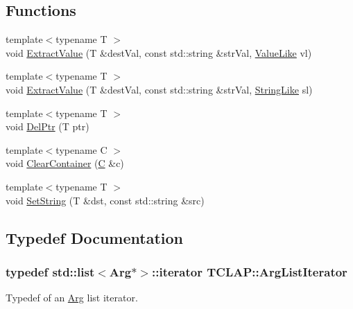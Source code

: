 \subsection*{Functions}
\begin{DoxyCompactItemize}
\item 
{\footnotesize template$<$typename T $>$ }\\void \hyperlink{namespace_t_c_l_a_p_af5bcb51791e31b88ad7de17b0f238dfb}{Extract\+Value} (T \&dest\+Val, const std\+::string \&str\+Val, \hyperlink{struct_t_c_l_a_p_1_1_value_like}{Value\+Like} vl)
\item 
{\footnotesize template$<$typename T $>$ }\\void \hyperlink{namespace_t_c_l_a_p_a5aed21a9cca57b42a03b783d15be417e}{Extract\+Value} (T \&dest\+Val, const std\+::string \&str\+Val, \hyperlink{struct_t_c_l_a_p_1_1_string_like}{String\+Like} sl)
\item 
{\footnotesize template$<$typename T $>$ }\\void \hyperlink{namespace_t_c_l_a_p_a92889c51d265522dcbd9764f6a329879}{Del\+Ptr} (T ptr)
\item 
{\footnotesize template$<$typename C $>$ }\\void \hyperlink{namespace_t_c_l_a_p_ac0852ccd31a36e9281090f1eec77652b}{Clear\+Container} (\hyperlink{hashing__utils_8hpp_ac4cf4b2ab929bd23951a8676eeac086b}{C} \&c)
\item 
{\footnotesize template$<$typename T $>$ }\\void \hyperlink{namespace_t_c_l_a_p_aa537f6ad6d9293215127810ba24260c6}{Set\+String} (T \&dst, const std\+::string \&src)
\end{DoxyCompactItemize}


\subsection{Typedef Documentation}
\hypertarget{namespace_t_c_l_a_p_aa7d6a803e0690c3c8b1db57c145648c5}{}
\subsubsection[{Arg\+List\+Iterator}]{\setlength{\rightskip}{0pt plus 5cm}typedef std\+::list$<${\bf Arg}$\ast$$>$\+::iterator {\bf T\+C\+L\+A\+P\+::\+Arg\+List\+Iterator}}\label{namespace_t_c_l_a_p_aa7d6a803e0690c3c8b1db57c145648c5}
Typedef of an \hyperlink{class_t_c_l_a_p_1_1_arg}{Arg} list iterator. 

